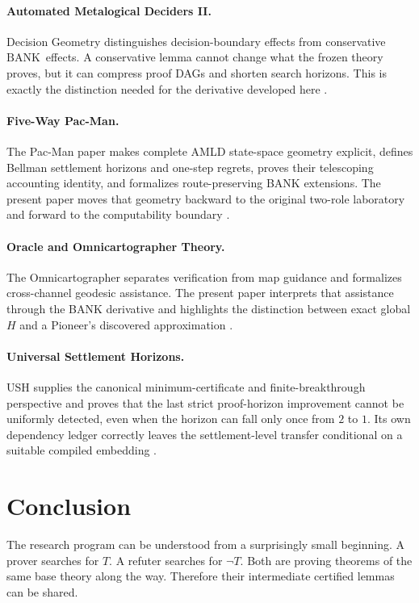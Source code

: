 \documentclass[11pt]{article}
\theoremstyle{remark}
\newcommand{\BANK}{\ensuremath{\mathrm{BANK}}}
\begin{document}
\paragraph{Automated Metalogical Deciders II.}
Decision Geometry distinguishes decision-boundary effects from conservative \BANK\ effects. A conservative lemma cannot change what the frozen theory proves, but it can compress proof DAGs and shorten search horizons. This is exactly the distinction needed for the derivative developed here \cite{TennesonAMLDII}.

\paragraph{Five-Way Pac-Man.}
The Pac-Man paper makes complete AMLD state-space geometry explicit, defines Bellman settlement horizons and one-step regrets, proves their telescoping accounting identity, and formalizes route-preserving BANK extensions. The present paper moves that geometry backward to the original two-role laboratory and forward to the computability boundary \cite{TennesonPacMan}.

\paragraph{Oracle and Omnicartographer Theory.}
The Omnicartographer separates verification from map guidance and formalizes cross-channel geodesic assistance. The present paper interprets that assistance through the BANK derivative and highlights the distinction between exact global $H$ and a Pioneer's discovered approximation \cite{TennesonOracle}.

\paragraph{Universal Settlement Horizons.}
USH supplies the canonical minimum-certificate and finite-breakthrough perspective and proves that the last strict proof-horizon improvement cannot be uniformly detected, even when the horizon can fall only once from $2$ to $1$. Its own dependency ledger correctly leaves the settlement-level transfer conditional on a suitable compiled embedding \cite{TennesonUSH}.

\section{Conclusion}

The research program can be understood from a surprisingly small beginning. A prover searches for $T$. A refuter searches for $\neg T$. Both are proving theorems of the same base theory along the way. Therefore their intermediate certified lemmas can be shared.
\end{document}
